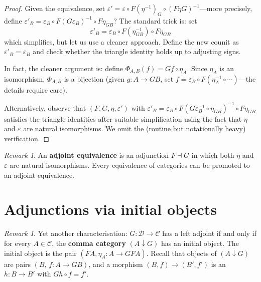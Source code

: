 \documentclass[a4paper,12pt]{book}
\theoremstyle{definition}
\theoremstyle{plain}
\theoremstyle{remark}
\newtheorem{remark}[definition]{Remark}
\begin{document}
\begin{proof}
Given the equivalence, set $\varepsilon' = \varepsilon \circ F(\eta^{-1})_{G}
\circ (F\eta G)^{-1}$---more precisely, define
$\varepsilon'_B = \varepsilon_B \circ F(G\varepsilon_B)^{-1} \circ F\eta_{GB}$?
The standard trick is: set
\[
    \varepsilon'_B = \varepsilon_B \circ F(\eta^{-1}_{GB}) \circ F\eta_{GB}
\]
which simplifies, but let us use a cleaner approach.
Define the new counit as
$\varepsilon'_B = \varepsilon_B$ and check whether the triangle
identity holds up to adjusting signs.

In fact, the cleaner argument is: define $\Phi_{A,B}(f) = Gf\circ\eta_A$.
Since $\eta_A$ is an isomorphism, $\Phi_{A,B}$ is a bijection
(given $g\colon A\to GB$, set $f = \varepsilon_B\circ F(\eta_A^{-1}\circ
\cdots)$---the details require care).

Alternatively, observe that $(F,G,\eta,\varepsilon')$ with
$\varepsilon'_B = \varepsilon_B\circ F(G\varepsilon_B^{-1}\circ\eta_{GB})^{-1}
\circ F\eta_{GB}$ satisfies the triangle identities
after suitable simplification using the fact that $\eta$ and $\varepsilon$
are natural isomorphisms.  We omit the (routine but notationally heavy)
verification.
\end{proof}

\begin{remark}\label{rem:adjoint-equivalence}
An \textbf{adjoint equivalence} is an adjunction $F\dashv G$ in which
both $\eta$ and $\varepsilon$ are natural isomorphisms.
Every equivalence of categories can be promoted to an adjoint equivalence.
\end{remark}


\section{Adjunctions via initial objects}\label{sec:adj-comma}

\begin{remark}\label{rem:adj-comma-cat}
Yet another characterisation: $G\colon\mathcal{D}\to\mathcal{C}$ has a
left adjoint if and only if for every $A\in\mathcal{C}$, the
\textbf{comma category} $(A\downarrow G)$ has an initial object.
The initial object is the pair $(FA,\eta_A\colon A\to GFA)$.
Recall that objects of $(A\downarrow G)$ are pairs $(B,\,f\colon A\to GB)$,
and a morphism $(B,f)\to(B',f')$ is an $h\colon B\to B'$ with
$Gh\circ f = f'$.
\end{remark}
\end{document}
